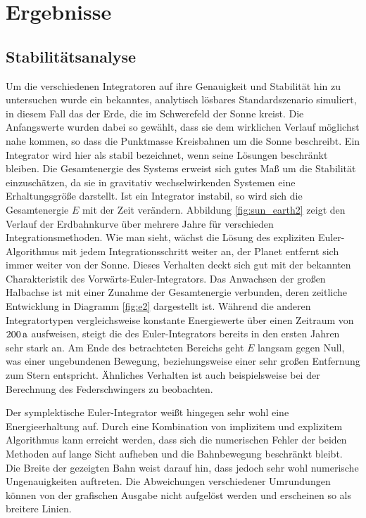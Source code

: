 \section{Ergebnisse} %
\label{sec:ergebnisse}

  \subsection{Stabilitätsanalyse} %
  \label{sub:stabilitätsanalyse}

    Um die verschiedenen Integratoren auf ihre Genauigkeit und Stabilität hin zu untersuchen wurde ein bekanntes, analytisch lösbares Standardszenario simuliert, in diesem Fall das der Erde, die im Schwerefeld der Sonne kreist.
    Die Anfangswerte wurden dabei so gewählt, dass sie dem wirklichen Verlauf möglichst nahe kommen, so dass die Punktmasse Kreisbahnen um die Sonne beschreibt.
    Ein Integrator wird hier als stabil bezeichnet, wenn seine Lösungen beschränkt bleiben.
    Die Gesamtenergie des Systems erweist sich gutes Maß um die Stabilität einzuschätzen, da sie in gravitativ wechselwirkenden Systemen eine Erhaltungsgröße darstellt.
    Ist ein Integrator instabil, so wird sich die Gesamtenergie $E$ mit der Zeit verändern.
    Abbildung \ref{fig:sun_earth2} zeigt den Verlauf der Erdbahnkurve über mehrere Jahre für verschieden Integrationsmethoden.
    Wie man sieht, wächst die Lösung des expliziten Euler-Algorithmus mit jedem Integrationsschritt weiter an, der Planet entfernt sich immer weiter von der Sonne.
    Dieses Verhalten deckt sich gut mit der bekannten Charakteristik des Vorwärts-Euler-Integrators.
    Das Anwachsen der großen Halbachse ist mit einer Zunahme der Gesamtenergie verbunden, deren zeitliche Entwicklung in Diagramm \ref{fig:e2} dargestellt ist.
    Während die anderen Integratortypen vergleichsweise konstante Energiewerte über einen Zeitraum von $200\,\mathrm{a}$ ausfweisen, steigt die des Euler-Integrators bereits in den ersten Jahren sehr stark an.
    Am Ende des betrachteten Bereichs geht $E$ langsam gegen Null, was einer ungebundenen Bewegung, beziehungsweise einer sehr großen Entfernung zum Stern entspricht.
    Ähnliches Verhalten ist auch beispielsweise bei der Berechnung des Federschwingers zu beobachten.

    Der symplektische Euler-Integrator weißt hingegen sehr wohl eine Energieerhaltung auf.
    Durch eine Kombination von implizitem und explizitem Algorithmus kann erreicht werden, dass sich die numerischen Fehler der beiden Methoden auf lange Sicht aufheben und die Bahnbewegung beschränkt bleibt.
    Die Breite der gezeigten Bahn weist darauf hin, dass jedoch sehr wohl numerische Ungenauigkeiten auftreten.
    Die Abweichungen verschiedener Umrundungen können von der grafischen Ausgabe nicht aufgelöst werden und erscheinen so als breitere Linien.

